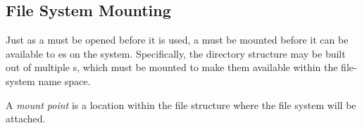 \subsection{File System Mounting}\label{subsec:File_System_Mounting}
Just as a  must be opened before it is used, a  must be mounted before it can be available to es on the system.
Specifically, the directory structure may be built out of multiple s, which must be mounted to make them available within the file-system name space.

\begin{definition}\label{def:Mount_Point}
  A \emph{mount point} is a location within the file structure where the file system will be attached.
\end{definition}


